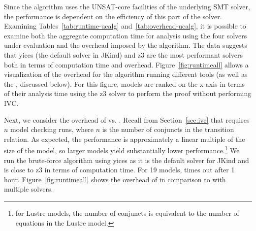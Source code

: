Since the \ucalg algorithm uses the UNSAT-core facilities of the underlying SMT solver, the performance is dependent on the efficiency of this part of the solver.  Examining Tables~\ref{tab:runtime-ucalg} and~\ref{tab:overhead-ucalg}, it is possible to examine both the aggregate computation time for analysis using the four solvers under evaluation and the overhead imposed by the \ucalg algorithm.  The data suggests that yices (the default solver in JKind) and z3 are the most performant solvers both in terms of computation time and overhead.  Figure~\ref{fig:runtimeall} allows a visualization of the overhead for the \ucalg algorithm running different tools (as well as the \bfalg, discussed below).  For this figure, models are ranked on the x-axis in terms of their analysis time using the z3 solver to perform the proof without performing IVC.






Next, we consider the overhead of \ucalg vs. \bfalg.  Recall from Section~\ref{sec:ivc} that \bfalg requires $n$ model checking runs, where $n$ is the number of conjuncts in the transition relation. As expected, the performance is approximately a linear multiple of the size of the model, so larger models yield substantially lower performance.\footnote{for Lustre models, the number of conjuncts is equivalent to the number of equations in the Lustre model.}  We run the brute-force algorithm using yices as it is the default solver for JKind and is close to z3 in terms of computation time.  For 19 models, \bfalg times out after 1 hour.   Figure~\ref{fig:runtimeall} shows the overhead of \bfalg in comparison to \ucalg with multiple solvers.

